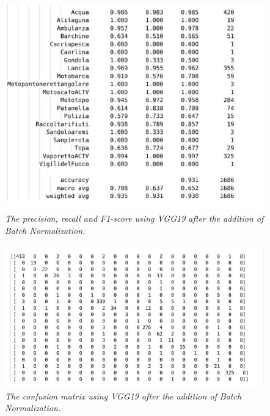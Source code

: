 \documentclass[12pt,a4paper]{report}
\begin{document}
\begin{figure}[H]
\centering
\includegraphics[scale=0.7]{./immagini/vgg19/2_data_augmentation_-_30_epochs_no_stopping_-_dropout_0p5_-_classifier_batch_norm/f1.JPEG}
\caption{\textit{The precision, recall and F1-score using VGG19 after the addition of Batch Normalization.}}
\end{figure}
\begin{figure}[H]
\centering
\includegraphics[scale=0.8]{./immagini/vgg19/2_data_augmentation_-_30_epochs_no_stopping_-_dropout_0p5_-_classifier_batch_norm/cm_num.JPEG}
\caption{\textit{The confusion matrix using VGG19 after the addition of Batch Normalization.}}
\end{figure}

\pagebreak
\end{document}
